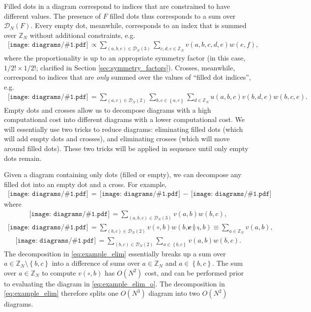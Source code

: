 \documentclass[nofootinbib,notitlepage,11pt]{revtex4-2}
\newcommand{\p}[1]{\left(#1\right)} %
\renewcommand{\set}[1]{\left\{#1\right\}} %
\newcommand{\1}{\mathds{1}}
\newcommand{\D}{\mathcal{D}}
\newcommand{\ZZ}{\mathbb{Z}}
\newcommand{\diagram}[1]
{\,\texttt{[image: diagrams/\#1.pdf]}\,}
\begin{document}
Filled dots in a diagram correspond to indices that are constrained to
have different values.  The presence of $F$ filled dots thus
corresponds to a sum over $\D_N\p{F}$.  Every empty dot, meanwhile,
corresponds to an index that is summed over $\ZZ_N$ without additional
constraints, e.g.
\begin{align}
  \diagram{example_o}
  \propto \sum_{\p{a,b,e}\in\D_N\p{3}} \sum_{c,d,e\in\ZZ_N}
  v\p{a,b,c,d,e} w\p{e,f},
\end{align}
where the proportionality is up to an appropriate symmetry factor (in
this case, $1/2!\times1/2!$; clarified in Section
\ref{sec:symmetry_factors}).  Crosses, meanwhile, correspond to
indices that are {\it only} summed over the values of ``filled dot
indices'', e.g.
\begin{align}
  \diagram{example_x}
  = \sum_{\p{a,e}\in\D_N\p{2}} \sum_{b,c\in\set{a,e}}
  \sum_{d\in\ZZ_N} u\p{a,b,c} v\p{b,d,e} w\p{b,c,e}.
\end{align}
Empty dots and crosses allow us to decompose diagrams with a high
computational cost into different diagrams with a lower computational
cost.  We will essentially use two tricks to reduce diagrams:
eliminating filled dots (which will add empty dots and crosses), and
eliminating crosses (which will move around filled dots).  These two
tricks will be applied in sequence until only empty dots remain.

Given a diagram containing only dots (filled or empty), we can
decompose any filled dot into an empty dot and a cross.  For example,
\begin{align}
  \diagram{example_elim}
  = \diagram{example_elim_o}
  - \diagram{example_elim_x}
  \label{eq:example_elim}
\end{align}
where
\begin{align}
  \diagram{example_elim}
  = \sum_{\p{a,b,c}\in\D_N\p{3}} v\p{a,b} w\p{b,c},
\end{align}
\begin{align}
  \diagram{example_elim_o}
  = \sum_{\p{b,c}\in\D_N\p{2}} v\p{\circ,b} w\p{b,c},
  &&
  v\p{\circ,b} \equiv \sum_{a\in\ZZ_N} v\p{a,b},
  \label{eq:example_elim_o}
\end{align}
\begin{align}
  \diagram{example_elim_x}
  = \sum_{\p{b,c}\in\D_N\p{2}} \sum_{a\in\set{b,c}}
  v\p{a,b} w\p{b,c}.
  \label{eq:example_elim_x}
\end{align}
The decomposition in \eqref{eq:example_elim} essentially breaks up a
sum over $a\in\ZZ_N\setminus\set{b,c}$ into a difference of sums over
$a\in\ZZ_N$ and $a\in\set{b,c}$.  The sum over $a\in\ZZ_N$ to compute
$v\p{\circ,b}$ has $O\p{N^2}$ cost, and can be performed prior to
evaluating the diagram in \eqref{eq:example_elim_o}.  The
decomposition in \eqref{eq:example_elim} therefore splits one
$O\p{N^3}$ diagram into two $O\p{N^2}$ diagrams.
\end{document}
